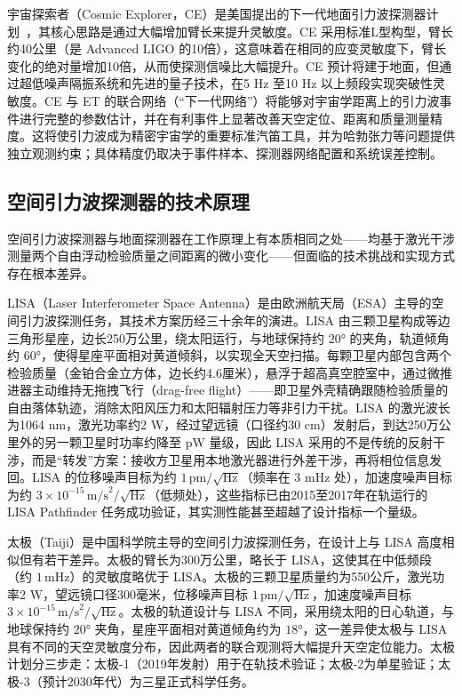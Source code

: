 宇宙探索者（Cosmic Explorer，CE）是美国提出的下一代地面引力波探测器计划~\cite{Evans2021CE}，其核心思路是通过大幅增加臂长来提升灵敏度。CE 采用标准L型构型，臂长约40公里（是 Advanced LIGO 的10倍），这意味着在相同的应变灵敏度下，臂长变化的绝对量增加10倍，从而使探测信噪比大幅提升。CE 预计将建于地面，但通过超低噪声隔振系统和先进的量子技术，在5 Hz 至10 Hz 以上频段实现突破性灵敏度。CE 与 ET 的联合网络（“下一代网络”）将能够对宇宙学距离上的引力波事件进行完整的参数估计，并在有利事件上显著改善天空定位、距离和质量测量精度。这将使引力波成为精密宇宙学的重要标准汽笛工具，并为哈勃张力等问题提供独立观测约束；具体精度仍取决于事件样本、探测器网络配置和系统误差控制。

\subsection{空间引力波探测器的技术原理}

空间引力波探测器与地面探测器在工作原理上有本质相同之处——均基于激光干涉测量两个自由浮动检验质量之间距离的微小变化——但面临的技术挑战和实现方式存在根本差异。

LISA（Laser Interferometer Space Antenna）是由欧洲航天局（ESA）主导的空间引力波探测任务，其技术方案历经三十余年的演进。LISA 由三颗卫星构成等边三角形星座，边长250万公里，绕太阳运行，与地球保持约 $20°$ 的夹角，轨道倾角约 $60°$，使得星座平面相对黄道倾斜，以实现全天空扫描。每颗卫星内部包含两个检验质量（金铂合金立方体，边长约4.6厘米），悬浮于超高真空腔室中，通过微推进器主动维持无拖拽飞行（drag-free flight）——即卫星外壳精确跟随检验质量的自由落体轨迹，消除太阳风压力和太阳辐射压力等非引力干扰。LISA 的激光波长为1064 nm，激光功率约2 W，经过望远镜（口径约30 cm）发射后，到达250万公里外的另一颗卫星时功率约降至 pW 量级，因此 LISA 采用的不是传统的反射干涉，而是“转发”方案：接收方卫星用本地激光器进行外差干涉，再将相位信息发回。LISA 的位移噪声目标为约 $1\,\text{pm}/\sqrt{\text{Hz}}$（频率在 3 mHz 处），加速度噪声目标为约 $3 \times 10^{-15}\,\text{m/s}^2/\sqrt{\text{Hz}}$（低频处），这些指标已由2015至2017年在轨运行的 LISA Pathfinder 任务成功验证，其实测性能甚至超越了设计指标一个量级。

太极（Taiji）是中国科学院主导的空间引力波探测任务，在设计上与 LISA 高度相似但有若干差异。太极的臂长为300万公里，略长于 LISA，这使其在中低频段（约 $1\,\text{mHz}$）的灵敏度略优于 LISA。太极的三颗卫星质量约为550公斤，激光功率2 W，望远镜口径300毫米，位移噪声目标 $1\,\text{pm}/\sqrt{\text{Hz}}$，加速度噪声目标 $3 \times 10^{-15}\,\text{m/s}^2/\sqrt{\text{Hz}}$。太极的轨道设计与 LISA 不同，采用绕太阳的日心轨道，与地球保持约 $20°$ 夹角，星座平面相对黄道倾角约为 $18°$，这一差异使太极与 LISA 具有不同的天空灵敏度分布，因此两者的联合观测将大幅提升天空定位能力。太极计划分三步走：太极-1（2019年发射）用于在轨技术验证；太极-2为单星验证；太极-3（预计2030年代）为三星正式科学任务。

